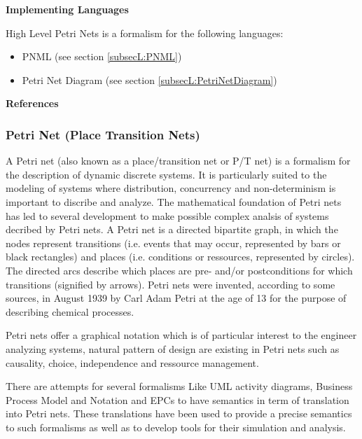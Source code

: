 \textbf{Implementing Languages}

High Level Petri Nets is a formalism for the following languages:
\begin{itemize}
	\item PNML (see section \ref{subsecL:PNML})
	\item Petri Net Diagram (see section \ref{subsecL:PetriNetDiagram})
\end{itemize}





\textbf{References}




\subsubsection{Petri Net (Place Transition Nets)}
\label{subsecF:PetriNet}


A Petri net (also known as a place/transition net or P/T net) is a formalism for the description of dynamic discrete systems. It is particularly suited to the modeling of systems where distribution, concurrency and non-determinism is important to discribe and analyze. The mathematical foundation of Petri nets has led to several development to make possible complex analsis of systems decribed by Petri nets. A Petri net is a directed bipartite graph, in which the nodes represent transitions (i.e. events that may occur, represented by bars or black rectangles) and places (i.e. conditions or ressources, represented by circles). The directed arcs describe which places are pre- and/or postconditions for which transitions (signified by arrows).  Petri nets were invented, according to some sources, in August 1939 by Carl Adam Petri at the age of 13 for the purpose of describing chemical processes.

Petri nets offer a graphical notation which is of particular interest to the engineer analyzing systems, natural pattern of design are existing in Petri nets such as causality, choice, independence and ressource management.

There are attempts for several formalisms Like UML activity diagrams, Business Process Model and Notation and EPCs to have semantics in term of translation into Petri nets. These translations have been used to provide a precise semantics to such formalisms as well as to  develop tools for their simulation and analysis.


